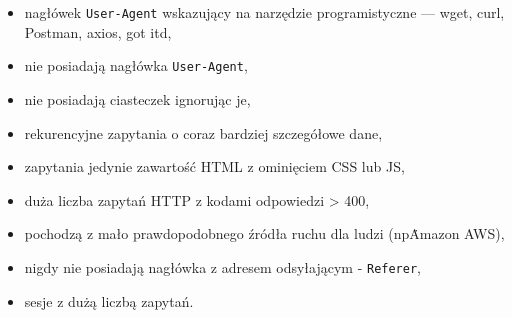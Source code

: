 \begin{itemize}
    \item nagłówek \texttt{User-Agent} wskazujący na narzędzie programistyczne --- wget, curl, Postman, axios, got itd,
    \item nie posiadają nagłówka \texttt{User-Agent},
    \item nie posiadają ciasteczek ignorując je,
    \item rekurencyjne zapytania o coraz bardziej szczegółowe dane,
    \item zapytania jedynie zawartość HTML z ominięciem CSS lub JS,
    \item duża liczba zapytań HTTP z kodami odpowiedzi > 400,
    \item pochodzą z mało prawdopodobnego źródła ruchu dla ludzi (np\. Amazon AWS),
    \item nigdy nie posiadają nagłówka z adresem odsyłającym - \texttt{Referer},
    \item sesje z dużą liczbą zapytań\cite{bot-buster}.
\end{itemize}
